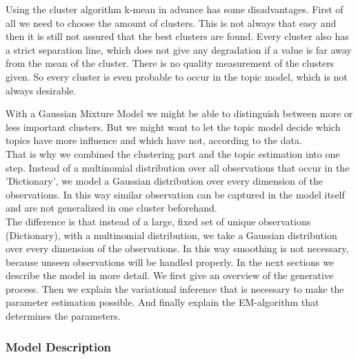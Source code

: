 \documentclass[a4paper,fleqn]{article}
\begin{document}
Using the cluster algorithm k-mean in advance has some disadvantages. First of all we need to choose the amount of clusters. This is not always that easy and then it is still not assured that the best clusters are found. Every cluster also has a strict separation line, which does not give any degradation if a value is far away from the mean of the cluster. There is no quality measurement of the clusters given. So every cluster is even probable to occur in the topic model, which is not always desirable.

With a Gaussian Mixture Model we might be able to distinguish between more or less important clusters. But we might want to let the topic model decide which topics have more influence and which have not, according to the data.\\
That is why we combined the clustering part and the topic estimation into one step. Instead of a multinomial distribution over all observations that occur in the 'Dictionary', we model a Gaussian distribution over every dimension of the observations. In this way similar observation can be captured in the model itself and are not generalized in one cluster beforehand.\\
The difference is that instead of a large, fixed set of unique observations (Dictionary), with a multinomial distribution, we take a Gaussian distribution over every dimension of the observations. In this way smoothing is not necessary, because unseen observations will be handled properly.
In the next sections we describe the model in more detail. We first give an overview of the generative process. Then we explain the variational inference that is necessary to make the parameter estimation possible. And finally explain the EM-algorithm that determines the parameters.


  \subsubsection{Model Description}
  
\end{document}

